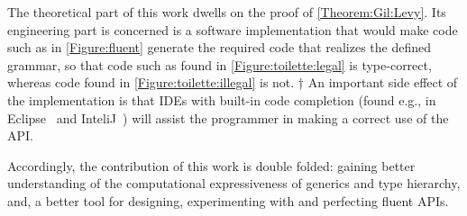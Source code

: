 The theoretical part of this work dwells on the proof of
  \cref{Theorem:Gil:Levy}.
Its engineering part is concerned is
  a software implementation that would make code
  such as in \cref{Figure:fluent} generate
  the required \Java code that realizes the
  defined grammar, so that code such as
  found in \cref{Figure:toilette:legal} is type-correct,
  whereas code found in \cref{Figure:toilette:illegal} is not.
†{%
An important side effect of the implementation is that IDEs with built-in code
completion
 (found e.g., in Eclipse~\cite{Eclipse:2009} and InteliJ~\cite{Jetbrains:2003})
 will assist the programmer in making a correct use of the API.
 }

Accordingly, the contribution of this work is double folded:
  gaining better understanding of the computational expressiveness of
  \Java generics and type hierarchy, and, a better tool
  for designing, experimenting with and perfecting fluent APIs.
